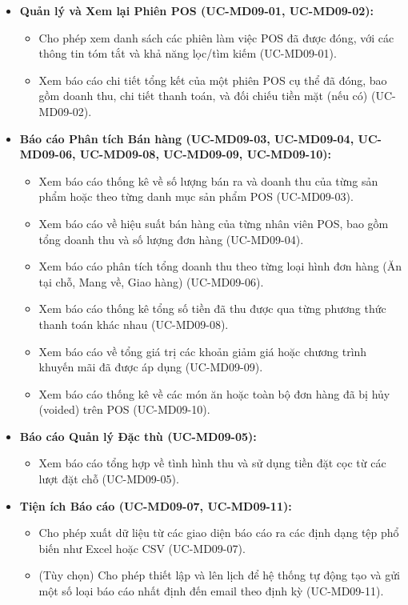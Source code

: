 \begin{itemize}
    \item \textbf{Quản lý và Xem lại Phiên POS (UC-MD09-01, UC-MD09-02):}
    \begin{itemize}
        \item Cho phép xem danh sách các phiên làm việc POS đã được đóng, với các thông tin tóm tắt và khả năng lọc/tìm kiếm (UC-MD09-01).
        \item Xem báo cáo chi tiết tổng kết của một phiên POS cụ thể đã đóng, bao gồm doanh thu, chi tiết thanh toán, và đối chiếu tiền mặt (nếu có) (UC-MD09-02).
    \end{itemize}

    \item \textbf{Báo cáo Phân tích Bán hàng (UC-MD09-03, UC-MD09-04, UC-MD09-06, UC-MD09-08, UC-MD09-09, UC-MD09-10):}
    \begin{itemize}
        \item Xem báo cáo thống kê về số lượng bán ra và doanh thu của từng sản phẩm hoặc theo từng danh mục sản phẩm POS (UC-MD09-03).
        \item Xem báo cáo về hiệu suất bán hàng của từng nhân viên POS, bao gồm tổng doanh thu và số lượng đơn hàng (UC-MD09-04).
        \item Xem báo cáo phân tích tổng doanh thu theo từng loại hình đơn hàng (Ăn tại chỗ, Mang về, Giao hàng) (UC-MD09-06).
        \item Xem báo cáo thống kê tổng số tiền đã thu được qua từng phương thức thanh toán khác nhau (UC-MD09-08).
        \item Xem báo cáo về tổng giá trị các khoản giảm giá hoặc chương trình khuyến mãi đã được áp dụng (UC-MD09-09).
        \item Xem báo cáo thống kê về các món ăn hoặc toàn bộ đơn hàng đã bị hủy (voided) trên POS (UC-MD09-10).
    \end{itemize}

    \item \textbf{Báo cáo Quản lý Đặc thù (UC-MD09-05):}
    \begin{itemize}
        \item Xem báo cáo tổng hợp về tình hình thu và sử dụng tiền đặt cọc từ các lượt đặt chỗ (UC-MD09-05).
    \end{itemize}

    \item \textbf{Tiện ích Báo cáo (UC-MD09-07, UC-MD09-11):}
    \begin{itemize}
        \item Cho phép xuất dữ liệu từ các giao diện báo cáo ra các định dạng tệp phổ biến như Excel hoặc CSV (UC-MD09-07).
        \item (Tùy chọn) Cho phép thiết lập và lên lịch để hệ thống tự động tạo và gửi một số loại báo cáo nhất định đến email theo định kỳ (UC-MD09-11).
    \end{itemize}
\end{itemize}

